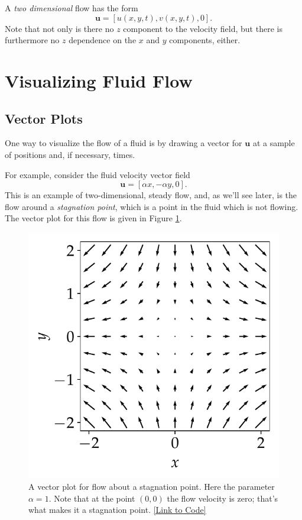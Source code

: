 \begin{example}
A \emph{two dimensional} flow has the form
\begin{equation}
\mathbf{u} = [u(x, y, t), v(x, y, t), 0].
\end{equation}
Note that not only is there no $z$ component to the velocity field, but there is furthermore no $z$ dependence on the
$x$ and $y$ components, either.
\end{example}





\section{Visualizing Fluid Flow}



\subsection{Vector Plots}

One way to visualize the flow of a fluid is by drawing a vector for $\mathbf{u}$ at a sample of positions and, if necessary, times.

\begin{example}
For example, consider the fluid velocity vector field
\begin{equation}
\label{eq_stag}
\mathbf{u} = [\alpha x, -\alpha y, 0].
\end{equation}
This is an example of two-dimensional, steady flow, and, as we'll see later, is the flow around a \emph{stagnation point}, which is a point in the fluid which is not flowing.  The vector plot for this flow is given in Figure \ref{fig_vector_plot}. 
\end{example}

\begin{figure}
\centering\includegraphics[width=0.5\linewidth]{Figures/Chapter1/fig_vector_plot}
\caption{A vector plot for flow about a stagnation point.  Here the parameter $\alpha = 1$.  Note that at the point $(0,0)$ the flow velocity is zero; that's what makes it a stagnation point. \href{https://nbviewer.jupyter.org/github/josephmacmillan/IntroFluidDynamics/blob/master/Jupyter/1-Introduction.ipynb\#Figure-1.2:-A-vector-plot-for-flow-about-a-stagnation-point}{[Link to Code]}}
\label{fig_vector_plot}
\end{figure}



